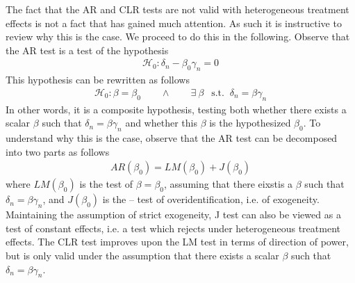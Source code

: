 The fact that the AR and CLR tests are not valid with heterogeneous treatment effects is not a fact that has gained much attention. As such it is instructive to review why this is the case. We proceed to do this in the following. Observe that the AR test is a test of the hypothesis
\begin{align}
    \mathcal{H}_0: \delta_n - \beta_0 \gamma_n = 0
\end{align}
This hypothesis can be rewritten as follows
\begin{align}
    \mathcal{H}_0: \beta = \beta_0 \qquad \land  \qquad \exists\   \beta \ \ \text{ s.t. }\ \delta_n =  \beta \gamma_n 
\end{align}
In other words, it is a composite hypothesis, testing both whether there exists a scalar \( \beta\) such that \(\delta_n =  \beta \gamma_n\) and whether this \( \beta\) is the hypothesized \(\beta_0\). To understand why this is the case, observe that the AR test can be decomposed into two parts as follows
\begin{align}
    AR(\beta_0) = LM(\beta_0) + J(\beta_0)
\end{align}
where \(LM(\beta_0)\) is the \cite{kleibergenGeneralizingWeakInstrument2007} test of \(\beta=\beta_0\), assuming that there eixstis a \( \beta\) such that \(\delta_n =  \beta \gamma_n \), and \(J(\beta_0)\) is the \cite{sarganEstimationEconomicRelationships1958}--\cite{hansenLargeSampleProperties1982} test of overidentification, i.e. of exogeneity. Maintaining the assumption of strict exogeneity, J test can also be viewed as a test of constant effects, i.e. a test which rejects under heterogeneous treatment effects. The \cite{moreiraConditionalLikelihoodRatio2003} CLR test improves upon the LM test in terms of direction of power, but is only valid under the assumption that there exists a scalar \( \beta\)  such that \( \delta_n =  \beta \gamma_n \).





